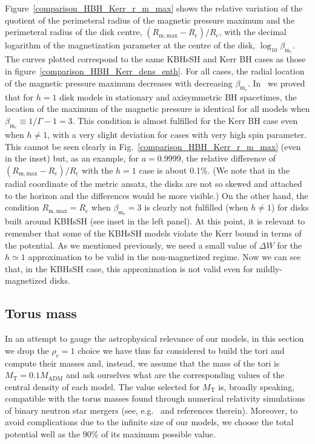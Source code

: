 \documentclass[twocolumn,aps,showpacs,showkeys,prd,superscriptaddress,byrevtex, amsmath]{revtex4-1}
\begin{document}
Figure~\ref{comparison_HBH_Kerr_r_m_max} shows the relative variation of the quotient of the perimeteral radius of the magnetic pressure maximum and the perimeteral radius of the disk centre, $(R_{\mathrm{m, max}}-R_{\mathrm{c}})/R_{\mathrm{c}}$, with the decimal logarithm of the magnetization parameter at the centre of the disk, $\log_{10} \beta_{\mathrm{m_c}}$. The curves plotted correspond to the same KBHsSH and Kerr BH cases as those in figure~\ref{comparison_HBH_Kerr_dens_enth}. For all cases, the radial location of the magnetic pressure maximum decreases with decreasing $\beta_{\mathrm{m_c}}$. In~\cite{Gimeno-Soler:2017} we proved that for $h=1$ disk models in stationary and axisymmetric BH spacetimes, the location of the maximum of the magnetic pressure is identical for all models when $\beta_{\mathrm{m_c}}\equiv 1 / \Gamma - 1=3$. This condition is almost fulfilled for the Kerr BH case  even when $h \neq 1$, with a very slight deviation for cases with very high spin parameter. This cannot be seen clearly in Fig.~\ref{comparison_HBH_Kerr_r_m_max} (even in the inset) but, as an example, for $a=0.9999$, the relative difference of $(R_{\mathrm{m, max}}-R_{\mathrm{c}})/R_{\mathrm{c}}$ with the $h=1$ case is about 0.1\%. (We note that in the radial coordinate of the metric ansatz, the disks are not so skewed and attached to the horizon and the differences would be more visible.) On the other hand, the condition $R_{\mathrm{m, max}}=R_{\mathrm{c}}$ when $\beta_{\mathrm{m_c}}= 3$ is clearly not fulfilled (when $h\neq 1$) for disks built around KBHsSH (see inset in the left panel). At this point, it is relevant to remember that some of the KBHsSH models violate the Kerr bound in terms of the potential. As we mentioned previously, we need a small value of $\Delta W$ for the $h \simeq 1$ approximation to be valid in the non-magnetized regime. Now we can see that, in the KBHsSH case, this approximation is not valid even for mildly-magnetized disks.

\subsection{Torus mass}

In an attempt to gauge the astrophysical relevance of our models, in this section we drop the $\rho_{\mathrm{c}} = 1$ choice we have thus far considered to build the tori and compute their masses and, instead, we assume that the mass of the tori is $M_{\mathrm{T}} = 0.1 M_{\mathrm{ADM}}$ and ask ourselves what are the corresponding values of the central density of each model. The value selected for $M_{\mathrm{T}}$ is, broadly speaking, compatible with the torus masses found through numerical relativity simulations of binary neutron star mergers (see, e.g.~\cite{Rezzolla:2010, Rezzolla:2017} and references therein). Moreover, to avoid complications due to the infinite size of our models, we choose the total potential well as the $90\%$ of its maximum possible value.
\end{document}
